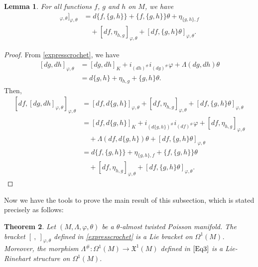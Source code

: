 \documentclass[a4paper,10pt]{article}
\numberwithin{equation}{section}
\theoremstyle{plain}
\newtheorem{theorem}{Theorem}[section]
\newtheorem{lemma}[theorem]{Lemma}
\begin{document}
		\begin{lemma}\label{lem2} For all  functions $f$, $g$ and $h$   on $M$, we have
			\begin{align*}
				[df,[dg,dh]_{\varphi,\theta}]_{\varphi,\theta} & =d\{f,\{g,h\}\}+\{f,\{g,h\}\}\theta+\eta_{\{g,h\},f}\\
				&\quad+[df,\eta_{h,g}]_{\varphi,\theta}+[df,\{g,h\}\theta]_{\varphi,\theta}.
			\end{align*}	
		\end{lemma}
		\begin{proof}
			From \eqref{expresscrochet}, we have
			\begin{align*}
				[dg,dh]_{\varphi,\theta} &= [dg,dh]_K+i_{(dh)^{\#}} i_{(dg)^{\#}}\varphi+ \Lambda(dg,dh) \theta\\
				&= d\{g,h\}+\eta_{h,g}+\{g,h\}\theta.
			\end{align*}
			Then,
			\begin{align*}
				\nonumber %
				[df,[dg,dh]_{\varphi,\theta}]_{\varphi,\theta}
				&= [df,d\{g,h\}]_{\varphi,\theta}+[df,\eta_{h,g}]_{\varphi,\theta} + [df,\{g,h\}\theta]_{\varphi,\theta} \\ \nonumber
				&=[df,d\{g,h\}]_K+i_{(d\{g,h\})^{\#}}i_{(df)^{\#}}\varphi +[df,\eta_{h,g}]_{\varphi,\theta}\\ \nonumber
				&\quad +\Lambda(df,d\{g,h\})\theta+[df,\{g,h\}\theta]_{\varphi,\theta}\nonumber\\
				&=d\{f,\{g,h\}\}+\eta_{\{g,h\},f}+\{f,\{g,h\}\}\theta \nonumber\\
				&\quad+[df,\eta_{h,g}]_{\varphi,\theta}+[df,\{g,h\}\theta]_{\varphi,\theta}.\nonumber
			\end{align*}
		\end{proof}
		Now we have the tools to prove the main result of this subsection, which is stated precisely as follows:
		\begin{theorem}\label{prop3}
			Let $(M,\Lambda,\varphi,\theta)$ be a $\theta$-almost twisted Poisson manifold. The bracket $[\ ,\ ]_{\varphi,\theta}$ defined in \eqref{expresscrochet} is  a  Lie bracket on $\Omega^1(M)$. Moreover, the morphism  $\Lambda^{\#} :\Omega^1(M)\longrightarrow \mathfrak{X}^1(M)$ defined  in $\eqref{Eq3}$ is  a Lie-Rinehart  structure on $\Omega^1(M)$.
		\end{theorem}
\end{document}
